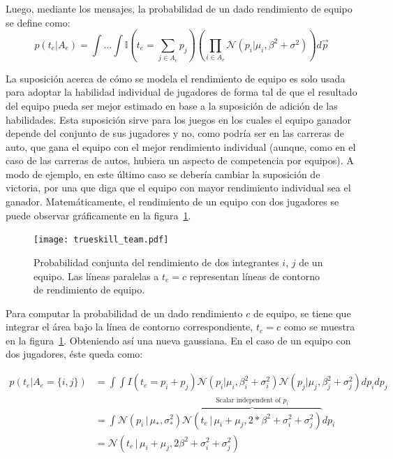 \documentclass[11pt,twoside,spanish]{report} %
\begin{document}
Luego, mediante los mensajes, la probabilidad de un dado rendimiento de equipo se define como:
\begin{equation}
p(t_e|A_e) = \int \dots \int \mathbb{I}(t_e = \sum_{j\in A_e } p_j ) \left(\prod_{i \in A_e} \mathcal{N}(p_i|\mu_i,\beta^2 + \sigma^2) \right) d\vec{p}
\end{equation}

La suposici\'on acerca de c\'omo se modela el rendimiento de equipo es solo usada para adoptar la habilidad individual de jugadores de forma tal de que el resultado del equipo pueda ser mejor estimado en base a la suposici\'on de adici\'on de las habilidades.
Esta suposici\'on sirve para los juegos en los cuales el equipo ganador depende del conjunto de sus jugadores y no, como podr\'ia ser en las carreras de auto, que gana el equipo con el mejor rendimiento individual (aunque, como en el caso de las carreras de autos, hubiera un aspecto de competencia por equipos).
A modo de ejemplo, en este \'ultimo caso se deber\'ia cambiar la suposici\'on de victoria, por una que diga que el equipo con mayor rendimiento individual sea el ganador.
Matem\'aticamente, el rendimiento de un equipo con dos jugadores se puede observar gr\'aficamente en la figura~\ref{fig:fig9}.

\begin{figure}[H]
	\centering
	\texttt{[image: trueskill\_team.pdf]}
	\caption{Probabilidad conjunta del rendimiento de dos integrantes $i$, $j$ de un equipo. Las l\'ineas paralelas a $t_e=c$ representan l\'ineas de contorno de rendimiento de equipo.}
	\label{fig:fig9}
\end{figure}

Para computar la probabilidad de un dado rendimiento $c$ de equipo, se tiene que integrar el \'area bajo la l\'inea de contorno correspondiente, $ t_e = c $ como se muestra en la figura~\ref{fig:fig9}.
Obteniendo as\'i una nueva gaussiana.
En el caso de un equipo con dos jugadores, \'este queda como:


\begin{equation}
\begin{split}
p(t_e|A_e=\{i,j\}) & =\int\int I(t_e=p_i+p_j)\mathcal{N}(p_i \vert \mu_i,\beta_i^2+\sigma_i^2)\mathcal{N}(p_j \vert \mu_j,\beta_j^2+\sigma_j^2)dp_idp_j\\
  & = \int \mathcal{N}(p_i\,|\,\mu_{*},\sigma_{*}^2) \overbrace{\mathcal{N}(t_e\,|\,\mu_i+\mu_j,2*\beta^2 + \sigma_i^2 + \sigma_j^2)}^{\text{Scalar independent of $p_i$}} dp_i \\[0.3cm]
& = \mathcal{N}(t_e \,|\, \mu_i+\mu_j,2\beta^2 + \sigma_i^2 + \sigma_j^2)
\end{split}
\end{equation}
\end{document}
